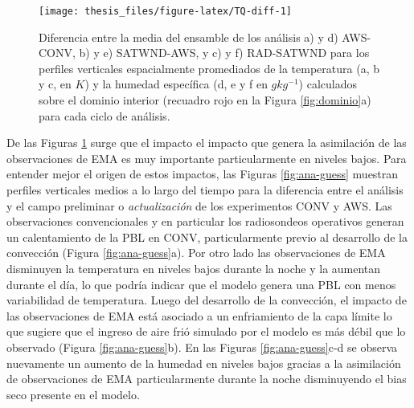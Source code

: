 \documentclass[12pt,oneside,a4paper]{reedthesis}
\begin{document}
\begin{figure}

\texttt{[image: thesis\_files/figure-latex/TQ-diff-1]} \hfill{}

\caption{Diferencia entre la media del ensamble de los análisis a) y d) AWS-CONV, b) y e) SATWND-AWS, y c) y f) RAD-SATWND para los perfiles verticales espacialmente promediados de la temperatura (a, b y c, en \(K\)) y la humedad específica (d, e y f en \(gkg^{-1}\)) calculados sobre el dominio interior (recuadro rojo en la Figura \ref{fig:dominio}a) para cada ciclo de análisis.}\label{fig:TQ-diff}
\end{figure}
De las Figuras \ref{fig:TQ-diff} surge que el impacto el impacto que genera la asimilación de las observaciones de EMA es muy importante particularmente en niveles bajos. Para entender mejor el origen de estos impactos, las Figuras \ref{fig:ana-guess} muestran perfiles verticales medios a lo largo del tiempo para la diferencia entre el análisis y el campo preliminar o \emph{actualización} de los experimentos CONV y AWS. Las observaciones convencionales y en particular los radiosondeos operativos generan un calentamiento de la PBL en CONV, particularmente previo al desarrollo de la convección (Figura \ref{fig:ana-guess}a). Por otro lado las observaciones de EMA disminuyen la temperatura en niveles bajos durante la noche y la aumentan durante el día, lo que podría indicar que el modelo genera una PBL con menos variabilidad de temperatura. Luego del desarrollo de la convección, el impacto de las observaciones de EMA está asociado a un enfriamiento de la capa límite lo que sugiere que el ingreso de aire frió simulado por el modelo es más débil que lo observado (Figura \ref{fig:ana-guess}b). En las Figuras \ref{fig:ana-guess}c-d se observa nuevamente un aumento de la humedad en niveles bajos gracias a la asimilación de observaciones de EMA particularmente durante la noche disminuyendo el bias seco presente en el modelo.
\end{document}
